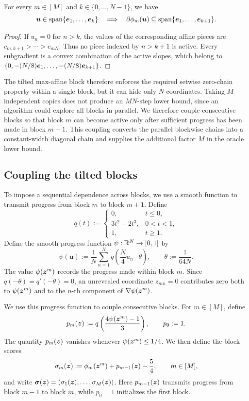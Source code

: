 \begin{lemma}
\label{lem:tilted-block-locality}
For every {$m\in[M]$ and} \(k\in\{0,\ldots,N-1\}\), we have 
\[
 \bm{u}\in\operatorname{span}\{\bm{e}_1,\ldots,\bm{e}_k\}
 \quad\Longrightarrow\quad
 \partial\phi_{m}(\bm{u})
 \subseteq
 \operatorname{span}\{\bm{e}_1,\ldots,
\bm{e}_{k+1}\}.
\]
\end{lemma}
\begin{proof}
If $u_n=0$ for $n>k$, the values of the corresponding affine
pieces are $c_{m,k+1}>\cdots>c_{mN}$. Thus no piece indexed by
$n>k+1$ is active. Every subgradient is a convex combination of
the active slopes, which belong to
$\{0,-(N/8)\bm{e}_1,\ldots,-(N/8)\bm{e}_{k+1}\}$.
\end{proof}

The tilted max-affine block therefore enforces the required setwise
zero-chain property within a single block, but it can hide only \(N\)
coordinates. Taking \(M\) independent copies does not produce an
\(MN\)-step lower bound, since {an algorithm} could explore
all blocks in parallel. We therefore couple consecutive blocks so that
block \(m\) can become active only after sufficient progress has been made
in block \(m-1\). This coupling converts the parallel blockwise chains into
a constant-width diagonal chain and supplies the additional factor \(M\)
in the oracle lower bound.

\subsection{Coupling the tilted blocks}
\label{subsec:block-coupling}
To impose a sequential dependence across blocks, we
use a smooth function to transmit progress from block \(m\) to block
\(m+1\).  Define 
\[
 q(t)
 :=
 \begin{cases}
  0, & t\leq 0,\\
  3t^2-2t^3, & 0<t<1,\\
  1, & t\geq 1.
 \end{cases}
\]
Define the smooth progress function \(\psi:{\mathbb{R}}^N\to[0,1]\) by
\[
 \psi(\bm{u})
 :=
 \frac{1}{N}\sum_{n=1}^N
 q\left(\frac{N}{4}u_n{-\theta}\right),\qquad {\theta:=\frac1{64N}.}
\]
The value \(\psi(\bm{z}^m)\) records the progress made within block \(m\).
Since \(q({-\theta})=q'({-\theta})=0\), an unrevealed coordinate \(z_{mn}=0\)
contributes zero both to \(\psi(\bm{z}^m)\) and to the \(n\)-th component of
\(\nabla\psi(\bm{z}^m)\).

We use this progress function to couple consecutive blocks.
For $m\in[M]$, define
\begin{equation}
 p_m(\bm{z}):=q\left(\frac{4\psi(\bm{z}^m)-1}{3}\right),
 \qquad p_0:=1.
 \label{newrand:gate}
\end{equation}
The quantity $p_m(\bm{z})$ vanishes whenever $\psi(\bm{z}^m)\le1/4$.
We then define the block scores
\[
 \sigma_m(\bm{z}):=\phi_m(\bm{z}^m)+p_{m-1}(\bm{z})-\frac54,
 \qquad m\in[M],
\]
and write $\boldsymbol\sigma(\bm{z})=(\sigma_1(\bm{z}),\ldots,\sigma_M(\bm{z}))$.
Here $p_{m-1}(\bm{z})$ transmits progress from block $m-1$ to
block $m$, while $p_0=1$ initializes the first block.

